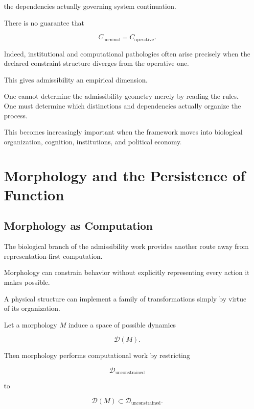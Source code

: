 \documentclass[11pt]{article}
\theoremstyle{remark}
\begin{document}
the dependencies actually governing system continuation.

There is no guarantee that

\begin{equation}
C_{\mathrm{nominal}}
=
C_{\mathrm{operative}}.
\end{equation}

Indeed, institutional and computational pathologies often arise precisely when the declared constraint structure diverges from the operative one.

This gives admissibility an empirical dimension.

One cannot determine the admissibility geometry merely by reading the rules. One must determine which distinctions and dependencies actually organize the process.

This becomes increasingly important when the framework moves into biological organization, cognition, institutions, and political economy.

\section{Morphology and the Persistence of Function}

\subsection{Morphology as Computation}

The biological branch of the admissibility work provides another route away from representation-first computation.

Morphology can constrain behavior without explicitly representing every action it makes possible.

A physical structure can implement a family of transformations simply by virtue of its organization.

Let a morphology $M$ induce a space of possible dynamics

\begin{equation}
\mathcal{D}(M).
\end{equation}

Then morphology performs computational work by restricting

\begin{equation}
\mathcal{D}_{\mathrm{unconstrained}}
\end{equation}

to

\begin{equation}
\mathcal{D}(M)
\subset
\mathcal{D}_{\mathrm{unconstrained}}.
\end{equation}
\end{document}
